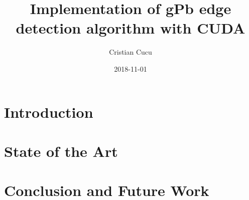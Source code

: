 \documentclass{article}
\title{Implementation of gPb edge detection algorithm with CUDA}
\date{2018-11-01}
\author{Cristian Cucu}
\begin{document}
\maketitle
\newpage
\lstset{language=C++}
\tableofcontents{}
\newpage

\section{Introduction}
\section{State of the Art}


\section{Conclusion and Future Work}
\end{document}
